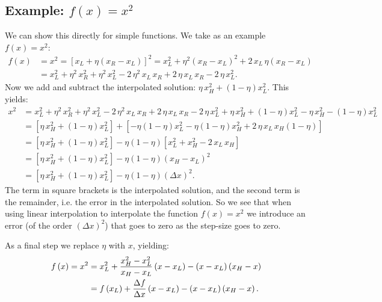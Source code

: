 \documentclass[10pt,preprint]{aastex}
\begin{document}
\subsection{Example: $f\left(x\right)=x^{2}$}
We can show this directly for simple functions. We take as an example $f\left(x\right)=x^{2}$:
\begin{align}
    f\left(x\right)&=x^{2}=\left[x_{L}+\eta\left(x_{R}-x_{L}\right)\right]^{2}=x_{L}^{2}+\eta^{2}\left(x_{R}-x_{L}\right)^{2}+2\,x_{L}\,\eta\left(x_{R}-x_{L}\right)\\
    &=x_{L}^{2}+\eta^{2}\,x_{R}^{2}+\eta^{2}\,x_{L}^{2}-2\,\eta^{2}\,x_{L}\,x_{R}+2\,\eta\,x_{L}\,x_{R}-2\,\eta\,x_{L}^{2}.
\end{align}
Now we add and subtract the interpolated solution: $\eta\,x_{H}^{2}+\left(1-\eta\right)x_{L}^{2}$. This yields:
\begin{align}
    x^{2}&=x_{L}^{2}+\eta^{2}\,x_{R}^{2}+\eta^{2}\,x_{L}^{2}-2\,\eta^{2}\,x_{L}\,x_{R}+2\,\eta\,x_{L}\,x_{R}-2\,\eta\,x_{L}^{2}+\eta\,x_{H}^{2}+\left(1-\eta\right)x_{L}^{2}-\eta\,x_{H}^{2}-\left(1-\eta\right)x_{L}^{2}\\
    &=\left[\eta\,x_{H}^{2}+\left(1-\eta\right)x_{L}^{2}\right]+\left[-\eta\left(1-\eta\right)x_{L}^{2}-\eta\left(1-\eta\right)x_{H}^{2}+2\,\eta\,x_{L}\,x_{H}\left(1-\eta\right)\right]\\
    &=\left[\eta\,x_{H}^{2}+\left(1-\eta\right)x_{L}^{2}\right]-\eta\left(1-\eta\right)\left[x_{L}^{2}+x_{H}^{2}-2\,x_{L}\,x_{H}\right]\\
    &=\left[\eta\,x_{H}^{2}+\left(1-\eta\right)x_{L}^{2}\right]-\eta\left(1-\eta\right)\left(x_{H}-x_{L}\right)^{2}\\
    &=\left[\eta\,x_{H}^{2}+\left(1-\eta\right)x_{L}^{2}\right]-\eta\left(1-\eta\right)\left(\Delta x\right)^{2}.
\end{align}
The term in square brackets is the interpolated solution, and the second term is the remainder, i.e. the error in the interpolated solution. So we see that when using linear interpolation to interpolate the function $f\left(x\right)=x^{2}$ we introduce an error (of the order $\left(\Delta x\right)^{2}$) that goes to zero as the step-size goes to zero.

As a final step we replace $\eta$ with $x$, yielding:
\begin{align}
    f\left(x\right)=x^{2}&=x_{L}^{2}+\frac{x_{H}^{2}-x_{L}^{2}}{x_{H}-x_{L}}\left(x-x_{L}\right)-\left(x-x_{L}\right)\left(x_{H}-x\right)\\
    &=f\left(x_{L}\right)+\frac{\Delta f}{\Delta x}\left(x-x_{L}\right)-\left(x-x_{L}\right)\left(x_{H}-x\right).
\end{align}
\end{document}
